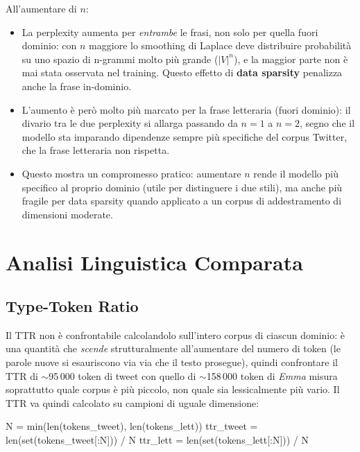 ﻿\documentclass[12pt,a4paper]{article}
\begin{document}
All'aumentare di $n$:
\begin{itemize}
  \item La perplexity aumenta per \emph{entrambe} le frasi, non solo per quella fuori dominio: con $n$ maggiore lo smoothing di Laplace deve distribuire probabilità su uno spazio di n-grammi molto più grande ($|V|^n$), e la maggior parte non è mai stata osservata nel training. Questo effetto di \textbf{data sparsity} penalizza anche la frase in-dominio.
  \item L'aumento è però molto più marcato per la frase letteraria (fuori dominio): il divario tra le due perplexity si allarga passando da $n=1$ a $n=2$, segno che il modello sta imparando dipendenze sempre più specifiche del corpus Twitter, che la frase letteraria non rispetta.
  \item Questo mostra un compromesso pratico: aumentare $n$ rende il modello più specifico al proprio dominio (utile per distinguere i due stili), ma anche più fragile per data sparsity quando applicato a un corpus di addestramento di dimensioni moderate.
\end{itemize}

\section{Analisi Linguistica Comparata}

\subsection{Type-Token Ratio}

Il TTR non è confrontabile calcolandolo sull'intero corpus di ciascun dominio: è una quantità che \emph{scende} strutturalmente all'aumentare del numero di token (le parole nuove si esauriscono via via che il testo prosegue), quindi confrontare il TTR di $\sim$95\,000 token di tweet con quello di $\sim$158\,000 token di \textit{Emma} misura soprattutto quale corpus è più piccolo, non quale sia lessicalmente più vario. Il TTR va quindi calcolato su campioni di uguale dimensione:

\begin{pylisting}[title={Calcolo del TTR su campioni di uguale dimensione}]
N = min(len(tokens_tweet), len(tokens_lett))
ttr_tweet = len(set(tokens_tweet[:N])) / N
ttr_lett  = len(set(tokens_lett[:N]))  / N
\end{pylisting}
\end{document}
